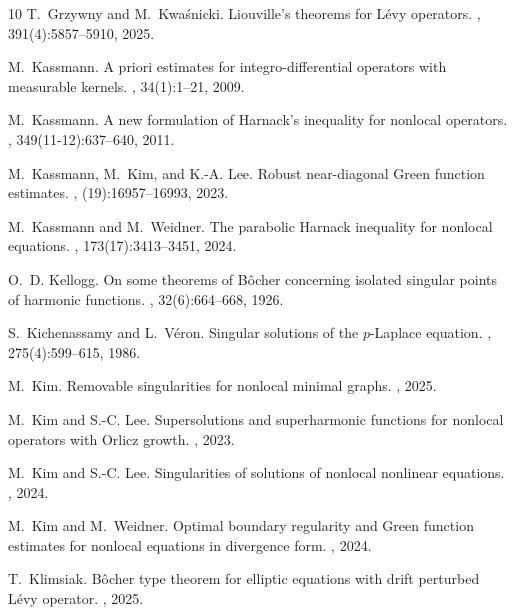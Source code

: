\documentclass[11pt]{amsart}
\theoremstyle{plain}
\theoremstyle{definition}
\numberwithin{equation}{section}
\begin{document}
\begin{thebibliography}{10}
T.~Grzywny and M.~Kwa\'snicki.
\newblock Liouville's theorems for {L}\'evy operators.
, 391(4):5857--5910, 2025.

M.~Kassmann.
\newblock A priori estimates for integro-differential operators with measurable
  kernels.
, 34(1):1--21, 2009.

M.~Kassmann.
\newblock A new formulation of {H}arnack's inequality for nonlocal operators.
, 349(11-12):637--640, 2011.

M.~Kassmann, M.~Kim, and K.-A. Lee.
\newblock Robust near-diagonal {G}reen function estimates.
, (19):16957--16993, 2023.

M.~Kassmann and M.~Weidner.
\newblock The parabolic {H}arnack inequality for nonlocal equations.
, 173(17):3413--3451, 2024.

O.~D. Kellogg.
\newblock On some theorems of {B}\^ocher concerning isolated singular points of
  harmonic functions.
, 32(6):664--668, 1926.

S.~Kichenassamy and L.~V\'{e}ron.
\newblock Singular solutions of the {$p$}-{L}aplace equation.
, 275(4):599--615, 1986.

M.~Kim.
\newblock Removable singularities for nonlocal minimal graphs.
, 2025.

M.~Kim and S.-C. Lee.
\newblock Supersolutions and superharmonic functions for nonlocal operators with {O}rlicz growth.
, 2023.

M.~Kim and S.-C. Lee.
\newblock Singularities of solutions of nonlocal nonlinear equations.
, 2024.

M.~Kim and M.~Weidner.
\newblock Optimal boundary regularity and {G}reen function estimates for
  nonlocal equations in divergence form.
, 2024.

T.~Klimsiak.
\newblock B{\^o}cher type theorem for elliptic equations with drift perturbed
  {L}\'evy operator.
, 2025.


\end{thebibliography}
\end{document}
